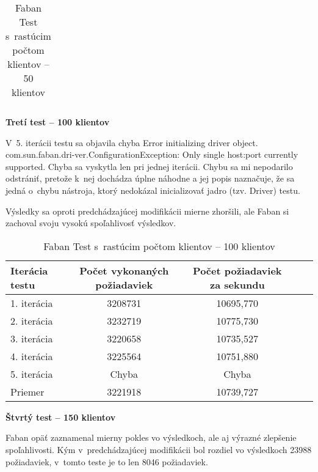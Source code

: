 \documentclass[12pt,oneside,final]{fithesis-utf8}
\begin{document}
\begin{itemize}
\begin{table}[H]
\begin{center}
\begin{tabular}{ | l | c | c | c | c |}
\end{tabular}
\end{center}
\caption{Faban Test s~rastúcim počtom klientov -- 50 klientov}
\end{table}


\textbf{Tretí test -- 100 klientov}

\hypertarget{label}{}
V~5. iterácii testu sa objavila chyba Error initializing driver object. com.sun.faban.dri-ver.ConfigurationException: Only single host:port currently supported. Chyba sa vyskytla len pri jednej iterácii. Chybu sa mi nepodarilo odstrániť, pretože k~nej dochádza úplne náhodne a jej popis naznačuje, že sa jedná o~chybu nástroja, ktorý nedokázal inicializovať jadro (tzv. Driver) testu.
\par Výsledky sa oproti predchádzajúcej modifikácii mierne zhoršili, ale Faban si zachoval svoju vysokú spoľahlivosť výsledkov.

\begin{table}[H]
\begin{center}
\begin{tabular}{ | l | c | c | c | c |}
		\hline
		 \textbf{Iterácia testu} & \textbf{Počet vykonaných požiadaviek} & \textbf{Počet požiadaviek za sekundu} \\ \hline
		 1. iterácia & 3208731 & 10695,770 \\ \hline
		 2. iterácia & 3232719 & 10775,730 \\ \hline
		 3. iterácia & 3220658 & 10735,527 \\ \hline
		 4. iterácia & 3225564 & 10751,880 \\ \hline
		 5. iterácia & Chyba & Chyba \\ \hline
		 Priemer & 3221918 & 10739,727 \\ \hline
		 
\end{tabular}
\end{center}
\caption{Faban Test s~rastúcim počtom klientov -- 100 klientov}
\end{table}


\textbf{Štvrtý test -- 150 klientov}

Faban opäť zaznamenal mierny pokles vo výsledkoch, ale aj výrazné zlepšenie spoľahlivosti. Kým v~predchádzajúcej modifikácii bol rozdiel vo výsledkoch 23988 požiadaviek, v~tomto teste je to len 8046 požiadaviek.


\end{itemize}
\end{document}
